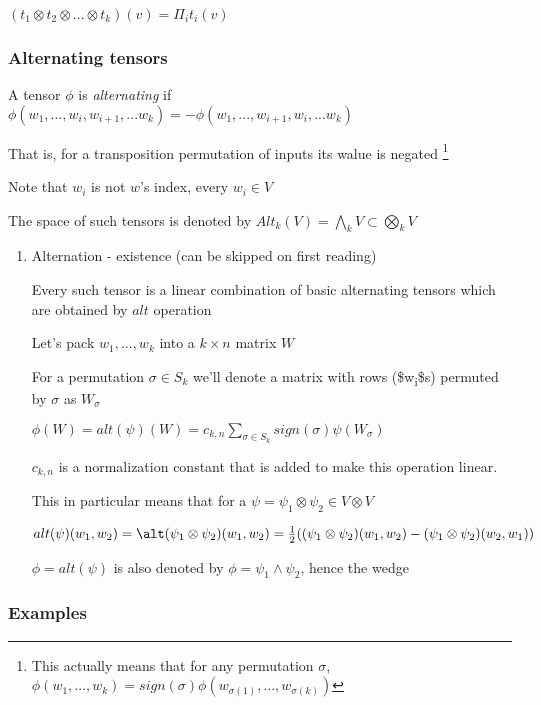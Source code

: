 \documentclass[11pt]{article}
\begin{document}
\((t_1 \otimes t_2 \otimes ... \otimes t_k)(v) = \Pi_i t_i(v)\)

\subsubsection{Alternating tensors}
\label{sec:orgc332540}

A tensor \(\phi\) is \emph{alternating} if \(\phi(w_1, ..., w_i, w_{i+1}, ... w_k) = - \phi(w_1, ..., w_{i+1}, w_i, ... w_k)\)

That is, for a transposition permutation of inputs its walue is negated \footnote{This actually means that for any permutation \(\sigma\), \(\phi(w_1, ..., w_k) = sign(\sigma) \phi(w_{\sigma(1)}, ..., w_{\sigma(k)})\)}

Note that \(w_i\) is not \(w\)'s index, every \(w_i \in V\)

The space of such tensors is denoted by \(Alt_k(V) = \bigwedge_k V \subset \bigotimes_k V\)

\begin{enumerate}
\item Alternation - existence (can be skipped on first reading)
\label{sec:orgb40ad84}

Every such tensor is a linear combination of basic alternating tensors which are obtained by \(alt\) operation

Let's pack \(w_1, ..., w_k\) into a \(k \times n\) matrix \(W\)

For a permutation \(\sigma \in S_k\) we'll denote a matrix with rows (\$w\textsubscript{i}\$s) permuted by \(\sigma\) as \(W_{\sigma}\)

\(\phi(W) = alt(\psi)(W) = c_{k, n} \sum_{\sigma \in S_k} sign(\sigma) \psi(W_{\sigma})\)

\(c_{k, n}\) is a normalization constant that is added to make this operation linear.

This in particular means that for a \(\psi = \psi_1 \otimes \psi_2 \in V \otimes V\)

\(alt(\psi)(w_1, w_2) = \alt(\psi_1 \otimes \psi_2)(w_1, w_2) = \frac{1}{2}((\psi_1 \otimes \psi_2)(w_1, w_2) - (\psi_1 \otimes \psi_2)(w_2, w_1))\)

\(\phi = alt(\psi)\) is also denoted by \(\phi = \psi_1 \wedge \psi_2\), hence the wedge
\end{enumerate}


\subsubsection{Examples}
\label{sec:org1241bf1}
\end{document}
